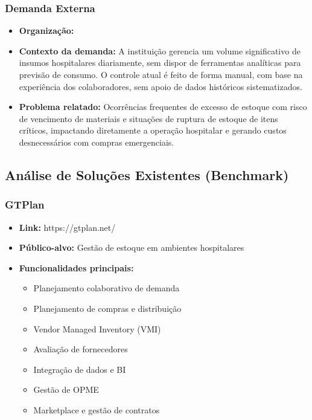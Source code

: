 \documentclass[12pt,a4paper]{article}
\begin{document}
\subsubsection{Demanda Externa}

\begin{itemize}
    \item \textbf{Organização:} 
    \item \textbf{Contexto da demanda:} A instituição gerencia um volume significativo de insumos hospitalares diariamente, sem dispor de ferramentas analíticas para previsão de consumo. O controle atual é feito de forma manual, com base na experiência dos colaboradores, sem apoio de dados históricos sistematizados.
    \item \textbf{Problema relatado:} Ocorrências frequentes de excesso de estoque com risco de vencimento de materiais e situações de ruptura de estoque de itens críticos, impactando diretamente a operação hospitalar e gerando custos desnecessários com compras emergenciais.
\end{itemize}

\subsection{Análise de Soluções Existentes (Benchmark)}

\subsubsection{GTPlan}

\begin{itemize}
    \item \textbf{Link:} https://gtplan.net/
    \item \textbf{Público-alvo:} Gestão de estoque em ambientes hospitalares
    \item \textbf{Funcionalidades principais:}
    \begin{itemize}
        \item Planejamento colaborativo de demanda
        \item Planejamento de compras e distribuição
        \item Vendor Managed Inventory (VMI)
        \item Avaliação de fornecedores
        \item Integração de dados e BI
        \item Gestão de OPME
        \item Marketplace e gestão de contratos
    \end{itemize}
\end{itemize}
\end{document}
